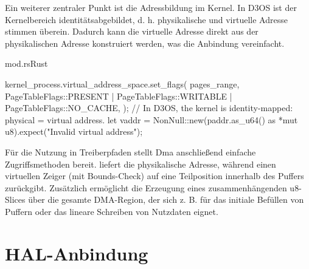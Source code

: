 Ein weiterer zentraler Punkt ist die Adressbildung im Kernel. In D3OS ist der Kernelbereich identitätsabgebildet, d. h. physikalische und virtuelle Adresse stimmen überein. Dadurch kann die virtuelle Adresse direkt aus der physikalischen Adresse konstruiert werden, was die Anbindung vereinfacht.

\begin{codeblock}{mod.rs}{Rust}
  \begin{rustcode}
kernel_process.virtual_address_space.set_flags(
    pages_range,
    PageTableFlags::PRESENT | PageTableFlags::WRITABLE | PageTableFlags::NO_CACHE,
);
// In D3OS, the kernel is identity-mapped: physical = virtual address.
let vaddr = NonNull::new(paddr.as_u64() as *mut u8).expect("Invalid virtual address");
  \end{rustcode}
\end{codeblock}
Für die Nutzung in Treiberpfaden stellt Dma anschließend einfache Zugriffsmethoden bereit.  liefert die physikalische Adresse, während  einen virtuellen Zeiger (mit Bounds-Check) auf eine Teilposition innerhalb des Puffers zurückgibt. Zusätzlich ermöglicht  die Erzeugung eines zusammenhängenden u8-Slices über die gesamte DMA-Region, der sich z. B. für das initiale Befüllen von Puffern oder das lineare Schreiben von Nutzdaten eignet.

\clearpage

\section{HAL-Anbindung}

